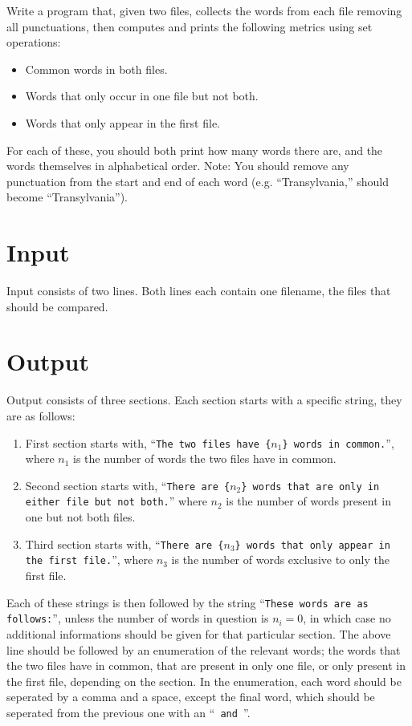 
Write a program that, given two files,
collects the words from each file removing all punctuations,
then computes and prints the following metrics using set operations:

\begin{itemize}
    \item Common words in both files.
    \item Words that only occur in one file but not both.
    \item Words that only appear in the first file.
\end{itemize}

For each of these, you should both print how many words there are, and the words themselves in alphabetical order.
Note: You should remove any punctuation from the start and end of each word (e.g. ``Transylvania,'' should become ``Transylvania'').

\section*{Input}
Input consists of two lines.
Both lines each contain one filename, the files that should be compared.


\section*{Output}
Output consists of three sections.
Each section starts with a specific string, they are as follows:
\begin{enumerate}
    \item First section starts with, ``\texttt{The two files have \{$n_1$\} words in common.}'',\\
where $n_1$ is the number of words the two files have in common.

    \item Second section starts with, ``\texttt{There are \{$n_2$\} words that are only in either file but not both.}''
where $n_2$ is the number of words present in one but not both files.

    \item Third section starts with, ``\texttt{There are \{$n_3$\} words that only appear in the first file.}'',
where $n_3$ is the number of words exclusive to only the first file.
\end{enumerate}

Each of these strings is then followed by the string ``\texttt{These words are as follows:}'',
unless the number of words in question is $n_i = 0$,
in which case no additional informations should be given for that particular section.
The above line should be followed by an enumeration of the relevant words;
the words that the two files have in common, that are present in only one file,
or only present in the first file, depending on the section.
In the enumeration, each word should be seperated by a comma and a space,
except the final word, which should be seperated from the previous one with an ``\texttt{ and }''.
